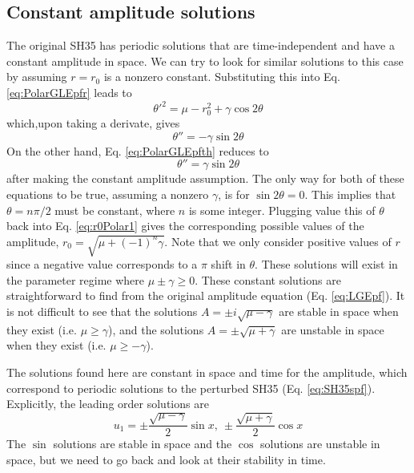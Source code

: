 \documentclass[api,pof,pre,12pt,a4paper]{revtex4-1}
\newcommand{\beqn}{\begin{equation}}
\newcommand{\eeqn}{\end{equation}}
\begin{document}
\subsection{Constant amplitude solutions}
The original SH35 has periodic solutions that are time-independent and have a constant amplitude in space.  We can try to look for similar solutions to this case by assuming $r=r_0$ is a nonzero constant. Substituting this into Eq. \ref{eq:PolarGLEpfr} leads to
\beqn
\theta'^2=\mu-r_0^2+\gamma \cos2\theta
\label{eq:r0Polar1}
\eeqn
which,upon taking a derivate, gives
\beqn
\theta''=-\gamma \sin2\theta
\eeqn
On the other hand, Eq. \ref{eq:PolarGLEpfth} reduces to 
\beqn
\theta''=\gamma \sin2\theta
\eeqn
after making the constant amplitude assumption.  The only way for both of these equations to be true, assuming a nonzero $\gamma$, is for $\sin2\theta=0$. This implies that $\theta=n\pi/2$ must be constant, where $n$ is some integer.  Plugging value this of $\theta$ back into Eq. \ref{eq:r0Polar1} gives the corresponding possible values of the amplitude, $r_0=\sqrt{\mu +(-1)^n\gamma}$. Note that we only consider positive values of $r$ since a negative value corresponds to a $\pi$ shift in $\theta$. These solutions will exist in the parameter regime where $\mu\pm\gamma\ge 0$.  These constant solutions are straightforward to find from the original amplitude equation (Eq. \ref{eq:LGEpf}).  It is not difficult to see that the solutions $A=\pm i \sqrt{\mu-\gamma}$ are stable in space when they exist (i.e. $\mu \geq \gamma$), and the solutions $A=\pm \sqrt{\mu+\gamma}$ are unstable in space when they exist (i.e. $\mu \geq-\gamma$).


The solutions found here are constant in space and time for the amplitude, which correspond to periodic solutions to the perturbed SH35 (Eq. \ref{eq:SH35spf}). Explicitly, the leading order solutions are 
\beqn
u_1=\pm \frac{\sqrt{\mu-\gamma}}{2} \sin x,\: \pm \frac{\sqrt{\mu+\gamma}}{2} \cos x
\eeqn
The $\sin$ solutions are stable in space and the $\cos$ solutions are unstable in space, but we need to go back and look at their stability in time.
\end{document}

